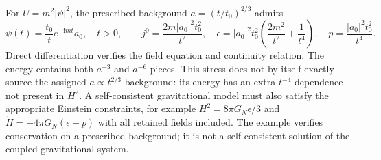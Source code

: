 \documentclass[aip,adv,reprint,onecolumn,amsmath,amssymb]{revtex4-2}
\newcommand{\ii}{\mathrm i}
\begin{document}
For $U=m^2|\psi|^2$, the prescribed background $a=(t/t_0)^{2/3}$ admits
\begin{equation}
 \psi(t)=\frac{t_0}t e^{-\ii mt}a_0,\quad t>0,\qquad
 j^0=\frac{2m|a_0|^2t_0^2}{t^2},\quad
 \epsilon=|a_0|^2t_0^2\left(\frac{2m^2}{t^2}+\frac1{t^4}\right),\quad
 p=\frac{|a_0|^2t_0^2}{t^4}.
 \label{eq:cosmo-example}
\end{equation}
Direct differentiation verifies the field equation and continuity relation. The energy contains both $a^{-3}$ and $a^{-6}$ pieces. This stress does not by itself exactly source the assigned $a\propto t^{2/3}$ background: its energy has an extra $t^{-4}$ dependence not present in $H^2$. A self-consistent gravitational model must also satisfy the appropriate Einstein constraints, for example $H^2=8\pi G_N\epsilon/3$ and $\dot H=-4\pi G_N(\epsilon+p)$ with all retained fields included. The example verifies conservation on a prescribed background; it is not a self-consistent solution of the coupled gravitational system.
\end{document}
